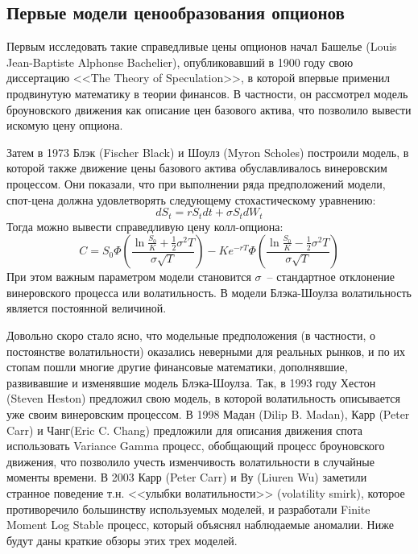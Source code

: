 \documentclass[oneside, final, 12pt]{article}
\begin{document}
\subsection{Первые модели ценообразования опционов}
Первым исследовать такие справедливые цены опционов начал Башелье (Louis Jean-Baptiste Alphonse Bachelier), опубликовавший в 1900 году свою диссертацию <<The Theory of Speculation>>, в которой впервые применил продвинутую математику в теории финансов. В частности, он рассмотрел модель броуновского движения как описание цен базового актива, что позволило вывести искомую цену опциона.

Затем в 1973 Блэк (Fischer Black) и Шоулз (Myron Scholes) построили модель, в которой также движение цены базового актива обуславливалось винеровским процессом. Они показали, что при выполнении ряда предположений модели, спот-цена должна удовлетворять следующему стохастическому уравнению:
\[ 
dS_t = r S_t dt + \sigma S_t dW_t 
\]
Тогда можно вывести справедливую цену колл-опциона:
\[
C=S_0\Phi\left(\frac{\ln{\frac{S_0}{K}}+\frac{1}{2}\sigma^2T}{\sigma\sqrt{T}}\right)-Ke^{-rT}\Phi\left(\frac{\ln{\frac{S_0}{K}}-\frac{1}{2}\sigma^2T}{\sigma\sqrt{T}}\right)
\]
При этом важным параметром модели становится $\sigma$~-- стандартное отклонение винеровского процесса или волатильность. В модели Блэка-Шоулза волатильность является постоянной величиной. \par
Довольно скоро стало ясно, что модельные предположения (в частности, о постоянстве волатильности) оказались неверными для реальных рынков, и по их стопам пошли многие другие финансовые математики, дополнявшие, развивавшие и изменявшие модель Блэка-Шоулза. Так, в 1993 году Хестон (Steven Heston) предложил свою модель, в которой волатильность описывается уже своим винеровским процессом. В 1998 Мадан (Dilip B. Madan), Карр (Peter Carr) и Чанг(Eric C. Chang) предложили для описания движения спота использовать Variance Gamma процесс, обобщающий процесс броуновского движения, что позволило учесть изменчивость волатильности в случайные моменты времени. В 2003 Карр (Peter Carr) и Ву (Liuren Wu) заметили странное поведение т.н. <<улыбки волатильности>> (volatility smirk), которое противоречило большинству используемых моделей, и разработали Finite Moment Log Stable процесс, который объяснял наблюдаемые аномалии. Ниже будут даны краткие обзоры этих трех моделей.

\newpage
\end{document}
